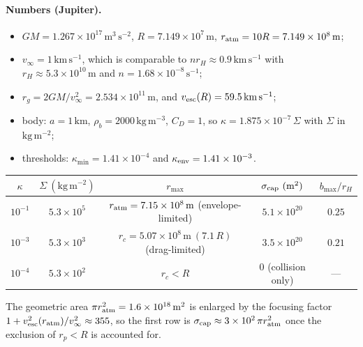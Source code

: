\documentclass{article}
\begin{document}
\paragraph{Numbers (Jupiter).}
\begin{itemize}
  \item $GM=1.267\times10^{17}\,\mathrm{m^{3}\,s^{-2}}$, $R=7.149\times10^{7}\,\mathrm{m}$,
        $r_{\rm atm}=10R=7.149\times10^{8}\,\mathrm{m}$;
  \item $v_\infty=1\,\mathrm{km\,s^{-1}}$, which is comparable to $n r_H\approx0.9\,\mathrm{km\,s^{-1}}$
        with $r_H\approx5.3\times10^{10}\,\mathrm{m}$ and $n=1.68\times10^{-8}\,\mathrm{s^{-1}}$;
  \item $r_g=2GM/v_\infty^{2}=2.534\times10^{11}\,\mathrm{m}$, and $v_{\rm esc}(R)=59.5\,\mathrm{km\,s^{-1}}$;
  \item body: $a=1\,\mathrm{km}$, $\rho_b=2000\,\mathrm{kg\,m^{-3}}$, $C_D=1$,
        so $\kappa=1.875\times10^{-7}\,\Sigma$ with $\Sigma$ in $\mathrm{kg\,m^{-2}}$;
  \item thresholds: $\kappa_{\min}=1.41\times10^{-4}$ and $\kappa_{\rm env}=1.41\times10^{-3}$.
\end{itemize}

\begin{center}
\begin{tabular}{|c|c|c|c|c|}
\hline
$\kappa$ & $\Sigma\ (\mathrm{kg\,m^{-2}})$ & $r_{\max}$ & $\sigma_{\rm cap}\ (\mathrm{m^{2}})$ & $b_{\max}/r_H$\\
\hline
$10^{-1}$ & $5.3\times10^{5}$ & $r_{\rm atm}=7.15\times10^{8}\,\mathrm{m}$ (envelope-limited) & $5.1\times10^{20}$ & $0.25$\\
$10^{-3}$ & $5.3\times10^{3}$ & $r_c=5.07\times10^{8}\,\mathrm{m}\ (7.1\,R)$ (drag-limited) & $3.5\times10^{20}$ & $0.21$\\
$10^{-4}$ & $5.3\times10^{2}$ & $r_c<R$ & $0$ (collision only) & ---\\
\hline
\end{tabular}
\end{center}

The geometric area $\pi r_{\rm atm}^{2}=1.6\times10^{18}\,\mathrm{m^{2}}$ is enlarged by the focusing factor
$1+v_{\rm esc}^{2}(r_{\rm atm})/v_\infty^{2}\approx 355$, so the first row is
$\sigma_{\rm cap}\approx3\times10^{2}\,\pi r_{\rm atm}^{2}$ once the exclusion of $r_p<R$ is accounted for.
\end{document}
